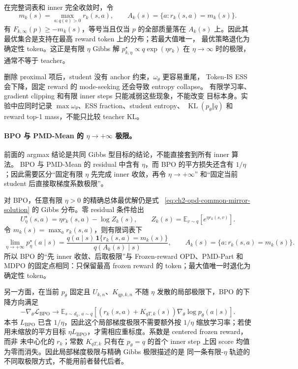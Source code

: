 在完整词表和 inner 完全收敛时，令
\begin{equation}
m_k(s)=\max_{a:q(a)>0}r_k(s,a),\qquad
A_k(s)=\{a:r_k(s,a)=m_k(s)\}.
\end{equation}
有 $F_{k,\infty}(p)\geq-m_k(s)$，等号当且仅当 $p$ 的全部质量落在 $A_k(s)$ 上。因此其最优集合是支持在最高 reward token 上的分布；若最大值唯一， 最优策略退化为确定性 token。这正是有限 $\eta$ Gibbs 解 $p_{k,\eta}^\star\propto q\exp(\eta r_k)$ 在 $\eta\to\infty$ 时的极限， 通常不等于 teacher。

删除 proximal 项后，student 没有 anchor 约束，$\omega_\theta$ 更容易重尾， Token-IS ESS 会下降，固定 reward 的 mode-seeking 还会导致 entropy collapse。 有限学习率、gradient clipping 和有限 inner steps 只能减弱这些现象，不能改变 目标本身。实验中应同时记录 $\max\omega_\theta$、ESS fraction、student entropy、 $\operatorname{KL}(p_\theta\Vert q)$ 和 reward top-1 mass，不能只比较 teacher KL。

\paragraph{BPO 与 PMD-Mean 的 $\eta\to+\infty$ 极限。} 前面的 argmax 结论是共同 Gibbs 型目标的结论，不能直接套到所有 inner 算法。 BPO 与 PMD-Mean 的 residual 中含有 $\eta$，而 BPO 的平方损失还含有 $1/\eta$；因此需要区分“固定有限 $\eta$ 先完成 inner 收敛，再令 $\eta\to+\infty$” 和“固定当前 student 后直接取梯度系数极限”。

对 BPO，任意有限 $\eta>0$ 的精确总体最优解仍是式 ~\eqref{eq:ch2-opd-common-mirror-solution} 的 Gibbs 分布。零 residual 条件给出
\begin{equation}
U^\star_\eta(s,a)=\eta r_k(s,a)-\log Z_k(s),
\qquad
Z_k(s)=\mathbb E_{v\sim q}\left[e^{\eta r_k(s,v)}\right].
\end{equation}
令 $m_k(s)=\max_a r_k(s,a)$，则有限词表下
\begin{equation}
\lim_{\eta\to+\infty}p^\star_{\eta}(a\mid s)
=\frac{q(a\mid s)\,\mathbf 1\{r_k(s,a)=m_k(s)\}}
{q(A_k(s)\mid s)},
\qquad A_k(s)=\{a:r_k(s,a)=m_k(s)\}.
\label{eq:ch2-opd-bpo-infinity-target}
\end{equation}
所以 BPO 的“先 inner 收敛、后取极限”与 Frozen-reward OPD、PMD-Part 和 MDPO 的固定点相同：只保留最高 frozen reward 的 token；最大值唯一时退化为 确定性 token。

另一方面，在当前 $p_\theta$ 固定且 $U_{k,n}$、$K_{qp,k,n}$ 不随 $\eta$ 发散的局部极限下，BPO 的下降方向满足
\begin{equation}
-\nabla_\theta\mathcal L_{\mathrm{BPO}}
\longrightarrow
\mathbb E_{s\sim d_k,\,a\sim q}
\left[(r_k(s,a)+K_{qT,k}(s))
\nabla_\theta\log p_\theta(a\mid s)\right].
\label{eq:ch2-opd-bpo-infinity-gradient}
\end{equation}
本书 $L_{\mathrm{BPO}}$ 已含 $1/\eta$，因此这个局部梯度极限不需要额外按 $1/\eta$ 缩放学习率；若使用未缩放的平方目标 $\eta L_{\mathrm{BPO}}$，才需相应重标度。系数是 centered frozen reward，而非 未中心化的 $r_k$；常数 $K_{qT,k}$ 只有在 $p_\theta=q$ 的首个 inner step 上因 score 均值为零而消失。因此局部梯度极限与精确 Gibbs 极限描述的是 同一条有限-$\eta$ 轨迹的不同取极限方式，不能用前者替代后者。

